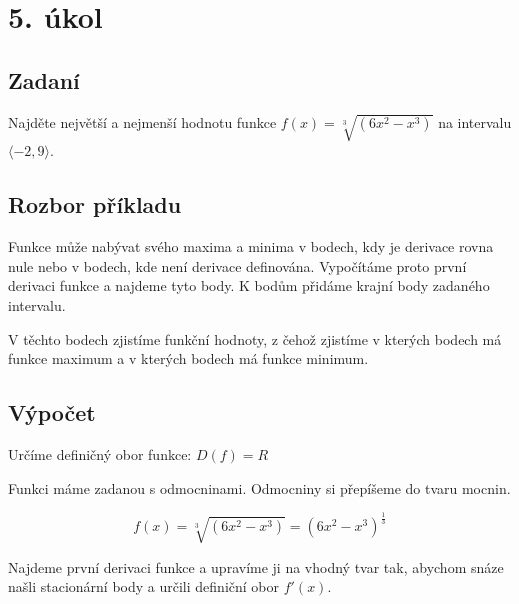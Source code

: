 \section{5. úkol}
\subsection{Zadaní}
 Najděte největší a nejmenší hodnotu funkce $f(x)=\sqrt[3]{(6x^2-x^3)} $ na intervalu $ \langle-2,9\rangle$.

\subsection{Rozbor příkladu}
Funkce může nabývat svého maxima a minima v bodech, kdy je derivace rovna nule nebo v bodech, kde není derivace definována. Vypočítáme proto první derivaci funkce a najdeme tyto body. K bodům přidáme krajní body zadaného intervalu.

V těchto bodech zjistíme funkční hodnoty, z čehož zjistíme v kterých bodech má funkce maximum a v kterých bodech má funkce minimum.
\subsection{Výpočet}
Určíme definičný obor funkce: $D(f)=R$

Funkci máme zadanou s odmocninami. Odmocniny si přepíšeme do tvaru mocnin.

\begin{displaymath}
f(x)=\sqrt[3]{(6x^2-x^3)}=(6x^2-x^3)^\frac{1}{3}
\end{displaymath}

Najdeme první derivaci funkce a upravíme ji na vhodný tvar tak, abychom snáze našli stacionární body a určili definiční obor $f'(x)$.


